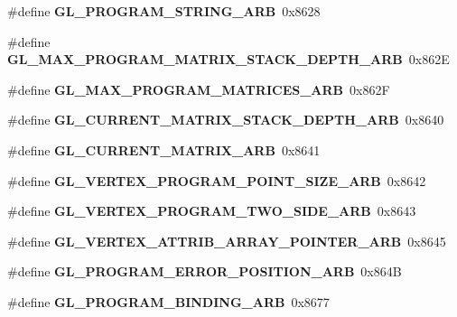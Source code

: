 \begin{DoxyCompactItemize}
\item 
\#define {\bfseries G\+L\+\_\+\+P\+R\+O\+G\+R\+A\+M\+\_\+\+S\+T\+R\+I\+N\+G\+\_\+\+A\+R\+B}~0x8628\label{_s_d_l__opengl_8h_a1d170de8ba33fba4c1538c7237f60cfb}

\item 
\#define {\bfseries G\+L\+\_\+\+M\+A\+X\+\_\+\+P\+R\+O\+G\+R\+A\+M\+\_\+\+M\+A\+T\+R\+I\+X\+\_\+\+S\+T\+A\+C\+K\+\_\+\+D\+E\+P\+T\+H\+\_\+\+A\+R\+B}~0x862\+E\label{_s_d_l__opengl_8h_a7078ed0e4123499049d0785b8dbd7817}

\item 
\#define {\bfseries G\+L\+\_\+\+M\+A\+X\+\_\+\+P\+R\+O\+G\+R\+A\+M\+\_\+\+M\+A\+T\+R\+I\+C\+E\+S\+\_\+\+A\+R\+B}~0x862\+F\label{_s_d_l__opengl_8h_a2044a9276264b61227f5c07f86631f46}

\item 
\#define {\bfseries G\+L\+\_\+\+C\+U\+R\+R\+E\+N\+T\+\_\+\+M\+A\+T\+R\+I\+X\+\_\+\+S\+T\+A\+C\+K\+\_\+\+D\+E\+P\+T\+H\+\_\+\+A\+R\+B}~0x8640\label{_s_d_l__opengl_8h_afe1cca8a77b823984170337b474d7d71}

\item 
\#define {\bfseries G\+L\+\_\+\+C\+U\+R\+R\+E\+N\+T\+\_\+\+M\+A\+T\+R\+I\+X\+\_\+\+A\+R\+B}~0x8641\label{_s_d_l__opengl_8h_a156dd80da92183d7b6a6f63f0edb29ea}

\item 
\#define {\bfseries G\+L\+\_\+\+V\+E\+R\+T\+E\+X\+\_\+\+P\+R\+O\+G\+R\+A\+M\+\_\+\+P\+O\+I\+N\+T\+\_\+\+S\+I\+Z\+E\+\_\+\+A\+R\+B}~0x8642\label{_s_d_l__opengl_8h_a5fd52c78c1e61a1ce4c6fe90020aaf23}

\item 
\#define {\bfseries G\+L\+\_\+\+V\+E\+R\+T\+E\+X\+\_\+\+P\+R\+O\+G\+R\+A\+M\+\_\+\+T\+W\+O\+\_\+\+S\+I\+D\+E\+\_\+\+A\+R\+B}~0x8643\label{_s_d_l__opengl_8h_ac046a6df3c13fa20a1eb19cf323b7a4e}

\item 
\#define {\bfseries G\+L\+\_\+\+V\+E\+R\+T\+E\+X\+\_\+\+A\+T\+T\+R\+I\+B\+\_\+\+A\+R\+R\+A\+Y\+\_\+\+P\+O\+I\+N\+T\+E\+R\+\_\+\+A\+R\+B}~0x8645\label{_s_d_l__opengl_8h_a5c10502ad1c7519986f795a7dcef0db8}

\item 
\#define {\bfseries G\+L\+\_\+\+P\+R\+O\+G\+R\+A\+M\+\_\+\+E\+R\+R\+O\+R\+\_\+\+P\+O\+S\+I\+T\+I\+O\+N\+\_\+\+A\+R\+B}~0x864\+B\label{_s_d_l__opengl_8h_a1c6a1bc963e289308bdc6cfc56045694}

\item 
\#define {\bfseries G\+L\+\_\+\+P\+R\+O\+G\+R\+A\+M\+\_\+\+B\+I\+N\+D\+I\+N\+G\+\_\+\+A\+R\+B}~0x8677\label{_s_d_l__opengl_8h_a7f1005bf576a00f8157e3d4cbcb84cf1}


\end{DoxyCompactItemize}
